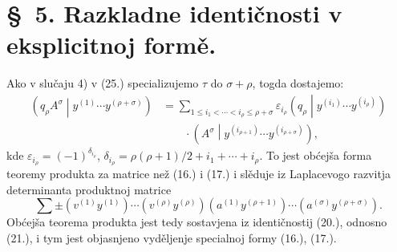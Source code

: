 \documentclass[11pt]{article}
\newcommand{\pair}[2]{\left(#1\middle|#2\right)}
\newcommand{\eps}{\varepsilon}
\begin{document}
\section*{\S\ 5. Razkladne identičnosti v eksplicitnoj formě.}

Ako v slučaju 4) v (25.) specializujemo $\tau$ do $\sigma+\rho$, togda dostajemo:
\begin{equation}
\begin{aligned}
 \pair{q_\rho A^\sigma}{y^{(1)}\cdots y^{(\rho+\sigma)}}
 &=\sum_{1\le i_1<\cdots<i_\rho\le \rho+\sigma}
 \eps_{i_\rho}\pair{q_\rho}{y^{(i_1)}\cdots y^{(i_\rho)}}\\
 &\qquad\cdot
 \pair{A^\sigma}{y^{(i_{\rho+1})}\cdots y^{(i_{\rho+\sigma})}},
\end{aligned}
\tag{32}
\end{equation}
kde $\eps_{i_\rho}=(-1)^{\delta_{i_\rho}}$, $\delta_{i_\rho}=\rho(\rho+1)/2+i_1+\cdots+i_\rho$. To jest obćejša forma teoremy produkta za matrice než (16.) i (17.) i slěduje iz Laplacevogo razvitja determinanta produktnoj matrice
\[
 \sum\pm(v^{(1)}y^{(1)})\cdots(v^{(\rho)}y^{(\rho)})
 (a^{(1)}y^{(\rho+1)})\cdots(a^{(\sigma)}y^{(\rho+\sigma)}).
\]
Obćejša teorema produkta jest tedy sostavjena iz identičnostij (20.), odnosno (21.), i tym jest objasnjeno vyděljenje specialnoj formy (16.), (17.).
\end{document}
